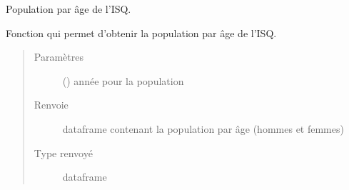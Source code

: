 \documentclass[letterpaper,10pt,french]{sphinxmanual}
\begin{document}

\begin{fulllineitems}
\label{\detokenize{code:simgen.isq}}
Population par âge de l’ISQ.

Fonction qui permet d’obtenir la population par âge de l’ISQ.
\begin{quote}\begin{description}
\item[{Paramètres}] \leavevmode
{} () \textendash{} année pour la population

\item[{Renvoie}] \leavevmode
dataframe  contenant la population par âge (hommes et femmes)

\item[{Type renvoyé}] \leavevmode
dataframe

\end{description}\end{quote}

\end{fulllineitems}

\end{document}
